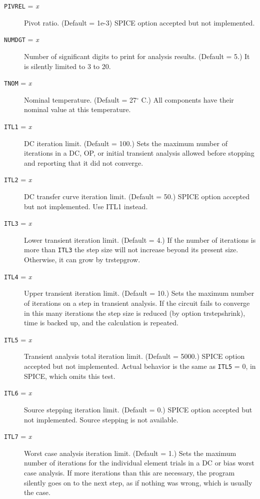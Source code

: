 \begin{description}
\item[{\tt PIVREL} = {\it x}] Pivot ratio.  (Default = 1e-3)
SPICE option accepted but not implemented.

\item[{\tt NUMDGT} = {\it x}] Number of significant digits to print
for analysis results.  (Default = 5.)  It is silently limited to 3
to 20.

\item[{\tt TNOM} = {\it x}] Nominal temperature.  (Default =
27$^{\circ}$ C.)
All components have their nominal value at this temperature.

\item[{\tt ITL1} = {\it x}] DC iteration limit.  (Default = 100.)
Sets the maximum number of iterations in a DC, OP, or initial
transient analysis allowed before stopping and reporting that it
did not converge.

\item[{\tt ITL2} = {\it x}] DC transfer curve iteration limit.
(Default = 50.)  SPICE option accepted but not implemented.
Use ITL1 instead.

\item[{\tt ITL3} = {\it x}] Lower transient iteration limit.
(Default = 4.)  If the number of iterations is more than {\tt ITL3}
the step size will not increase beyond its present size.  Otherwise,
it can grow by trstepgrow.

\item[{\tt ITL4} = {\it x}] Upper transient iteration limit.
(Default = 10.)  Sets the maximum number of iterations on a step
in transient analysis.  If the circuit fails to converge in this
many iterations the step size is reduced (by option trstepshrink),
time is backed up, and the calculation is repeated.

\item[{\tt ITL5} = {\it x}] Transient analysis total iteration
limit.  (Default = 5000.)  SPICE option accepted but not
implemented.  Actual behavior is the same as {\tt ITL5} = 0, in
SPICE, which omits this test.

\item[{\tt ITL6} = {\it x}] Source stepping iteration limit.
(Default = 0.)  SPICE option accepted but not implemented.
Source stepping is not available.

\item[{\tt ITL7} = {\it x}] Worst case analysis iteration
limit.  (Default = 1.)
Sets the maximum number of iterations for the individual
element trials in a DC or bias worst case analysis.  If more
iterations than this are necessary, the program silently goes
on to the next step, as if nothing was wrong, which is usually
the case.


\end{description}
